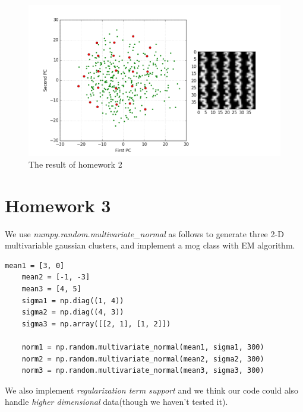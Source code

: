 \documentclass[12pt]{article}
\begin{document}
\begin{figure}[hbt]
  \centering
  \includegraphics[width=\textwidth]{hw2_result.png}
  \caption{The result of homework 2}
\end{figure}


\section{Homework 3}

We use {\em numpy.random.multivariate\_normal} as follows to generate three 2-D multivariable gaussian clusters, and implement a mog class with EM algorithm.

\begin{lstlisting}[frame=single]
    mean1 = [3, 0]
    mean2 = [-1, -3]
    mean3 = [4, 5]
    sigma1 = np.diag((1, 4))
    sigma2 = np.diag((4, 3))
    sigma3 = np.array([[2, 1], [1, 2]])

    norm1 = np.random.multivariate_normal(mean1, sigma1, 300)
    norm2 = np.random.multivariate_normal(mean2, sigma2, 300)
    norm3 = np.random.multivariate_normal(mean3, sigma3, 300)
\end{lstlisting}

We also implement {\em regularization term support} and we think our code could also handle {\em higher dimensional} data(though we haven't tested it).
\end{document}
